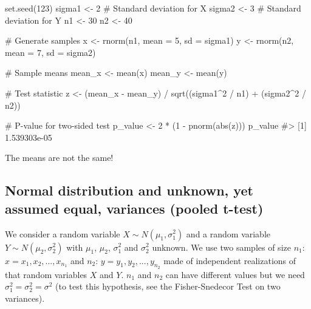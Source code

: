\documentclass[
  letterpaper,
  DIV=11,
  numbers=noendperiod]{scrreprt}
\newenvironment{Shaded}{\begin{snugshade}}{\end{snugshade}}
\newcommand{\AttributeTok}[1]{\textcolor[rgb]{0.40,0.45,0.13}{#1}}
\newcommand{\CommentTok}[1]{\textcolor[rgb]{0.37,0.37,0.37}{#1}}
\newcommand{\DecValTok}[1]{\textcolor[rgb]{0.68,0.00,0.00}{#1}}
\newcommand{\FunctionTok}[1]{\textcolor[rgb]{0.28,0.35,0.67}{#1}}
\newcommand{\NormalTok}[1]{\textcolor[rgb]{0.00,0.23,0.31}{#1}}
\newcommand{\OtherTok}[1]{\textcolor[rgb]{0.00,0.23,0.31}{#1}}
\newcommand{\SpecialCharTok}[1]{\textcolor[rgb]{0.37,0.37,0.37}{#1}}
\begin{document}
\begin{Shaded}
\begin{Highlighting}[]
\FunctionTok{set.seed}\NormalTok{(}\DecValTok{123}\NormalTok{) }
\NormalTok{sigma1 }\OtherTok{\textless{}{-}} \DecValTok{2} \CommentTok{\# Standard deviation for X}
\NormalTok{sigma2 }\OtherTok{\textless{}{-}} \DecValTok{3} \CommentTok{\# Standard deviation for Y}
\NormalTok{n1 }\OtherTok{\textless{}{-}} \DecValTok{30}
\NormalTok{n2 }\OtherTok{\textless{}{-}} \DecValTok{40}

\CommentTok{\# Generate samples}
\NormalTok{x }\OtherTok{\textless{}{-}} \FunctionTok{rnorm}\NormalTok{(n1, }\AttributeTok{mean =} \DecValTok{5}\NormalTok{, }\AttributeTok{sd =}\NormalTok{ sigma1)}
\NormalTok{y }\OtherTok{\textless{}{-}} \FunctionTok{rnorm}\NormalTok{(n2, }\AttributeTok{mean =} \DecValTok{7}\NormalTok{, }\AttributeTok{sd =}\NormalTok{ sigma2)}

\CommentTok{\# Sample means}
\NormalTok{mean\_x }\OtherTok{\textless{}{-}} \FunctionTok{mean}\NormalTok{(x)}
\NormalTok{mean\_y }\OtherTok{\textless{}{-}} \FunctionTok{mean}\NormalTok{(y)}

\CommentTok{\# Test statistic}
\NormalTok{z }\OtherTok{\textless{}{-}}\NormalTok{ (mean\_x }\SpecialCharTok{{-}}\NormalTok{ mean\_y) }\SpecialCharTok{/} \FunctionTok{sqrt}\NormalTok{((sigma1}\SpecialCharTok{\^{}}\DecValTok{2} \SpecialCharTok{/}\NormalTok{ n1) }\SpecialCharTok{+}\NormalTok{ (sigma2}\SpecialCharTok{\^{}}\DecValTok{2} \SpecialCharTok{/}\NormalTok{ n2))}

\CommentTok{\# P{-}value for two{-}sided test}
\NormalTok{p\_value }\OtherTok{\textless{}{-}} \DecValTok{2} \SpecialCharTok{*}\NormalTok{ (}\DecValTok{1} \SpecialCharTok{{-}} \FunctionTok{pnorm}\NormalTok{(}\FunctionTok{abs}\NormalTok{(z)))}
\NormalTok{p\_value}
\CommentTok{\#\textgreater{} [1] 1.539303e{-}05}
\end{Highlighting}
\end{Shaded}

The means are not the same!

\subsection{Normal distribution and unknown, yet assumed equal,
variances (pooled
t-test)}\label{normal-distribution-and-unknown-yet-assumed-equal-variances-pooled-t-test}

We consider a random variable \(X \sim N(\mu_1, \sigma_1^2)\) and a
random variable \(Y \sim N(\mu_2, \sigma_2^2)\) with \(\mu_1\),
\(\mu_2\), \(\sigma_1^2\) and \(\sigma_2^2\) unknown. We use two samples
of size \(n_1\): \(x = {x_1, x_2,..., x_{n_1}}\) and \(n_2\):
\(y = {y_1, y_2,..., y_{n_2}}\) made of independent realizations of that
random variables \(X\) and \(Y\). \(n_1\) and \(n_2\) can have different
values but we need \(\sigma^2_1 = \sigma^2_2 = \sigma^2\) (to test this
hypothesis, see the Fisher-Snedecor Test on two variances).
\end{document}
